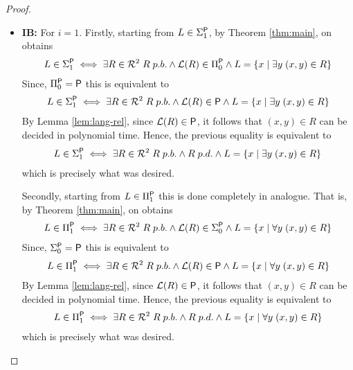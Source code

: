 \documentclass [11pt]{article}
\newcommand{\ccfont}[1]{\protect\mathsf{#1}}
\newcommand{\Ptime}{\ccfont{P}}
\newcommand{\phs}[1]{\Sigma_{#1}^{\Ptime}}
\newcommand{\php}[1]{\Pi_{#1}^{\Ptime}}
\begin{document}
\begin{proof}
\begin{itemize}
\item \textbf{IB:} For $i=1$.
Firstly, starting from $L \in \phs{1}$, by Theorem \ref{thm:main}, on obtains
\begin{equation*}
\begin{split}
L \in \phs{1} \iff \exists R \in \mathcal{R}^{2} \; R \; p.b.  \land \mathcal{L}(R) \in \php{0} \land L = \{x \mid \exists y \; (x,y) \in R\}
\end{split}
\end{equation*}
Since, $\php{0}=\Ptime$ this is equivalent to
\begin{equation*}
\begin{split}
L \in \phs{1} \iff  \exists R \in \mathcal{R}^{2} \; R \; p.b.  \land \mathcal{L}(R) \in \Ptime \land L = \{x \mid \exists y \; (x,y) \in R\}
\end{split}
\end{equation*}
By Lemma \ref{lem:lang-rel}, since $\mathcal{L}(R) \in \Ptime$, it follows that $(x,y) \in R$  can be decided in polynomial time. Hence, the previous equality is equivalent to 
\begin{equation*}
\begin{split}
L \in \phs{1} \iff  \exists R \in \mathcal{R}^{2} \; R \; p.b.  \land R \; p.d. \land L = \{x \mid \exists y \; (x,y) \in R\}
\end{split}
\end{equation*}
which is precisely what was desired.


Secondly, starting from $L \in \php{1}$ this is done completely in analogue. That is, by Theorem \ref{thm:main}, on obtains
\begin{equation*}
\begin{split}
L \in \php{1} \iff \exists R \in \mathcal{R}^{2} \; R \; p.b.  \land \mathcal{L}(R) \in \phs{0} \land L = \{x \mid \forall  y \; (x,y) \in R\}
\end{split}
\end{equation*}
Since, $\phs{0}=\Ptime$ this is equivalent to
\begin{equation*}
\begin{split}
L \in \php{1} \iff  \exists R \in \mathcal{R}^{2} \; R \; p.b.  \land \mathcal{L}(R) \in \Ptime \land L = \{x \mid \forall y \; (x,y) \in R\}
\end{split}
\end{equation*}
By Lemma \ref{lem:lang-rel}, since $\mathcal{L}(R) \in \Ptime$, it follows that $(x,y) \in R$  can be decided in polynomial time. Hence, the previous equality is equivalent to 
\begin{equation*}
\begin{split}
L \in \php{1} \iff  \exists R \in \mathcal{R}^{2} \; R \; p.b.  \land R \; p.d. \land L = \{x \mid \forall y \; (x,y) \in R\}
\end{split}
\end{equation*}
which is precisely what was desired.



\end{itemize}
\end{proof}
\end{document}

